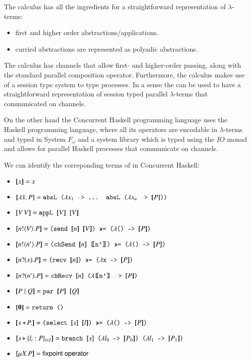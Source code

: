 \newcommand{\hask}[1]{\text{\fontfamily{cmtt}\selectfont #1}}

The \PHOpp calculus has all the ingredients for a straightforward
representation of $\lambda$-terms:
\begin{itemize}
	\item	first and higher order abstractions/applications.
	\item	curried abstractions are represented as polyadic abstractions.
\end{itemize}
The \PHOpp calculus has channels that allow first- and higher-order
passing, along with the standard parallel composition operator.
Furthermore, the calculus makes use of a session type system to
type processes.
In a sense the \PHOpp can be used to have a straightforward representation
of session typed parallel $\lambda$-terms that communicated on channels.

On the other hand the Concurrent Haskell programming language uses the
Haskell programming language, where all its operators are encodable in
$\lambda$-terms and typed in System $F_{\omega}$ and a system
library which is typed using the $IO$ monad 
and allows for parallel Haskell processes that communicate on channels.

We can identify the correponding terms of \PHOpp in Concurrent Haskell:
\begin{itemize}
	\item	$[\!\![x]\!\!] = x$
	\item	$\map{\abs{\tilde{x}}{P}} = \hask{absL ($\lambda{}x_1$ -> ... absL ($\lambda{}x_n$  -> $\map{P}$))}$
	\item	$\map{\appl{V}{V}} = \hask{appL $\map{V}$ $\map{V}$}$
	\item	$\map{\bout{n}{V} P} = \hask{(send $\map{n}$ $\map{V}$) >>= ($\lambda$() -> $\map{P}$)}$
	\item	$\map{\bout{n}{n'} P} = \hask{(chSend $\map{n}$ \map{n'}) >>= ($\lambda$() -> $\map{P}$)}$
	\item	$\map{\binp{n}{x} P} = \hask{(recv $\map{n}$) >>= ($\lambda$x -> $\map{P}$)}$
	\item	$\map{\binp{n}{n'} P} = \hask{chRecv $\map{n}$ ($\lambda$\map{n'} -> $\map{P}$)}$
	\item	$\map{P\Par Q} = \hask{par $\map{P}$ $\map{Q}$}$
	\item	$\map{\inact} = \hask{return ()}$
	\item	$\map{\bsel{s}{P}} = \hask{(select $\map{s}$ $\map{l}$) >>= ($\lambda$() -> $\map{P}$)}$
	\item	$\map{\bbra{s}{l_i: P}_{i \in I}} = \hask{branch $\map{s}$ ($\lambda{}l_0$ -> $\map{P_0}$) 
($\lambda{}l_1$ -> $\map{P_1}$)}$
	\item	$\map{\recp{X}{P}} = \mathsf{fixpoint\ operator}$
\end{itemize}

